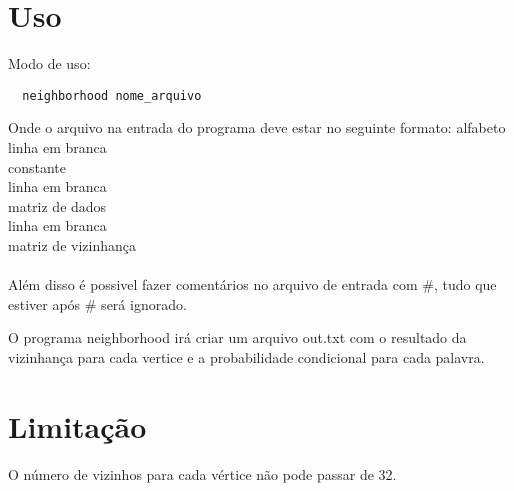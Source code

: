 \documentclass[a4paper, 12pt]{article}
\begin{document}
\section{Uso}
Modo de uso:
\begin{lstlisting}
  neighborhood nome_arquivo
\end{lstlisting}

Onde o arquivo na entrada do programa deve estar no seguinte formato:
alfabeto\\
linha em branca\\
constante\\
linha em branca\\
matriz de dados\\
linha em branca\\
matriz de vizinhança\\
\\
Além disso é possivel fazer comentários no arquivo de entrada com \#, tudo que estiver após \# será ignorado.

O programa neighborhood irá criar um arquivo out.txt com o resultado da vizinhança para cada vertice e a probabilidade condicional para cada palavra.

\section{Limitação}
O número de vizinhos para cada vértice não pode passar de 32.
\end{document}
